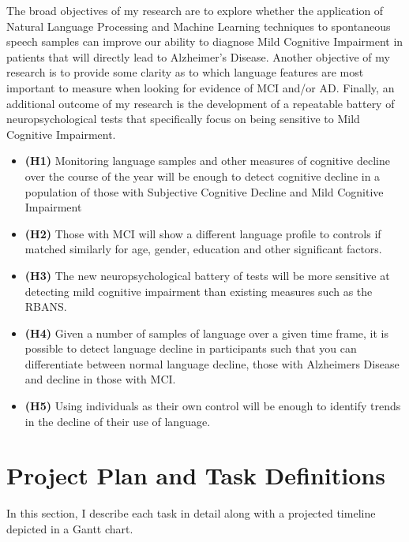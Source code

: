 \documentclass[10pt, letterpaper, twoside, openany]{book}
\begin{document}
\par 
The broad objectives of my research are to explore whether the application of Natural Language Processing and Machine Learning techniques to spontaneous speech samples can improve our ability to diagnose Mild Cognitive Impairment in patients that will directly lead to Alzheimer's Disease. Another objective of my research is to provide some clarity as to which language features are most important to measure when looking for evidence of MCI and/or AD. Finally, an additional outcome of my research is the development of a repeatable battery of neuropsychological tests that specifically focus on being sensitive to Mild Cognitive Impairment.
\begin{itemize}
	\item \textbf{(H1)} Monitoring language samples and other measures of cognitive decline over the course of the year will be enough to detect cognitive decline in a population of those with Subjective Cognitive Decline and Mild Cognitive Impairment
	\item \textbf{(H2)} Those with MCI will show a different language profile to controls if matched similarly for age, gender, education and other significant factors.
	\item \textbf{(H3)} The new neuropsychological battery of tests will be more sensitive at detecting mild cognitive impairment than existing measures such as the RBANS.
	\item \textbf{(H4)} Given a number of samples of language over a given time frame, it is possible to detect language decline in participants such that you can differentiate between normal language decline, those with Alzheimers Disease and decline in those with MCI.
	\item \textbf{(H5)} Using individuals as their own control will be enough to identify trends in the decline of their use of language.
\end{itemize}

\section{Project Plan and Task Definitions}
In this section, I describe each task in detail along with a projected timeline depicted in a Gantt chart.
\end{document}
